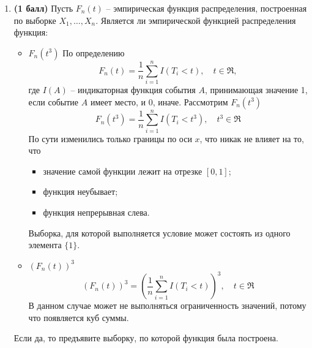 \documentclass{assignment}
\begin{document}
\begin{enumerate}
    \item \textbf{(1 балл)} Пусть $F_n(t)$ -- эмпирическая функция распределения, построенная по выборке $X_1, \ldots, X_n$. Является ли эмпирической функцией распределения функция:
    \begin{itemize}
        \item $F_n(t^3)$
        \start
        По определению
        \begin{equation}
            F_n(t) = \frac{1}{n}\sum_{i=1}^{n} I(T_i < t), \quad t \in \Re,
        \end{equation}
        где $I(A)$ -- индикаторная функция события $A$, принимающая значение 1, если событие $A$ имеет место, и 0, иначе. Рассмотрим $F_n(t^3)$
        \begin{equation}
            F_n(t^3) = \frac{1}{n}\sum_{i=1}^{n} I(T_i < t^3), \quad t^3 \in \Re
        \end{equation}
        По сути изменились только границы по оси $x$, что никак не влияет на то, что
        \begin{itemize}
            \item значение самой функции лежит на отрезке $[0,1]$;
            \item функция неубывает;
            \item функция непрерывная слева.
        \end{itemize}
        Выборка, для которой выполняется условие может состоять из одного элемента $\{1\}$.
        \finish
        \item $(F_n(t))^3$
        \start
        \begin{equation}
            (F_n(t))^3 = \left(\frac{1}{n}\sum_{i=1}^{n} I(T_i < t)\right)^3, \quad t \in \Re
        \end{equation}
        В данном случае может не выполняться ограниченность значений, потому что появляется куб суммы.
        \finish
    \end{itemize}
    Если да, то предъявите выборку, по которой функция была построена.


\end{enumerate}
\end{document}
